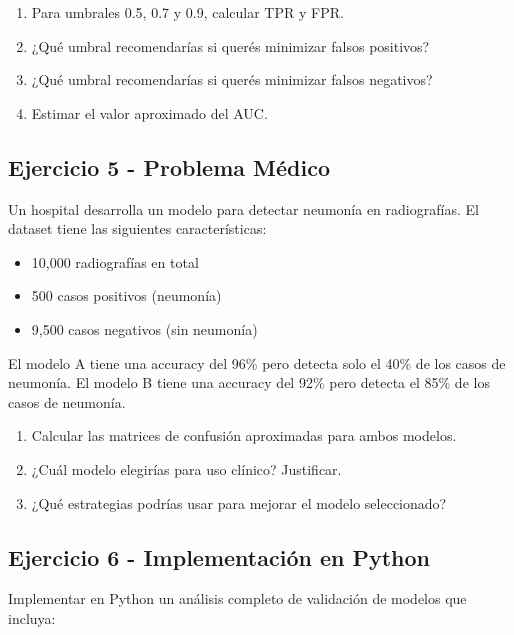 \documentclass[12pt]{article}
\begin{document}
\begin{enumerate}
    \item[a.] Para umbrales 0.5, 0.7 y 0.9, calcular TPR y FPR.
    \item[b.] ¿Qué umbral recomendarías si querés minimizar falsos positivos?
    \item[c.] ¿Qué umbral recomendarías si querés minimizar falsos negativos?
    \item[d.] Estimar el valor aproximado del AUC.
\end{enumerate}

\subsection{Ejercicio 5 - Problema Médico}

Un hospital desarrolla un modelo para detectar neumonía en radiografías. El dataset tiene las siguientes características:
\begin{itemize}
    \item 10,000 radiografías en total
    \item 500 casos positivos (neumonía)
    \item 9,500 casos negativos (sin neumonía)
\end{itemize}

El modelo A tiene una accuracy del 96\% pero detecta solo el 40\% de los casos de neumonía.
El modelo B tiene una accuracy del 92\% pero detecta el 85\% de los casos de neumonía.

\begin{enumerate}
    \item[a.] Calcular las matrices de confusión aproximadas para ambos modelos.
    \item[b.] ¿Cuál modelo elegirías para uso clínico? Justificar.
    \item[c.] ¿Qué estrategias podrías usar para mejorar el modelo seleccionado?
\end{enumerate}

\subsection{Ejercicio 6 - Implementación en Python}

Implementar en Python un análisis completo de validación de modelos que incluya:
\end{document}
